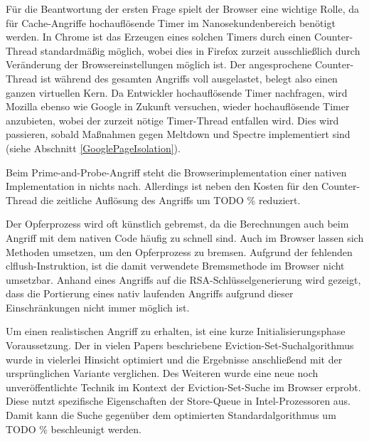 Für die Beantwortung der ersten Frage spielt der Browser eine wichtige Rolle, da für Cache-Angriffe hochauflösende Timer im Nanosekundenbereich benötigt werden.
In Chrome ist das Erzeugen eines solchen Timers durch einen Counter-Thread standardmäßig möglich, wobei dies in Firefox zurzeit ausschließlich durch Veränderung der Browsereinstellungen möglich ist.
Der angesprochene Counter-Thread ist während des gesamten Angriffs voll ausgelastet, belegt also einen ganzen virtuellen Kern.
Da Entwickler hochauflösende Timer nachfragen, wird Mozilla ebenso wie Google in Zukunft versuchen, wieder hochauflösende Timer anzubieten, wobei der zurzeit nötige Timer-Thread entfallen wird.
Dies wird passieren, sobald Maßnahmen gegen Meltdown und Spectre implementiert sind (siehe Abschnitt \ref{GooglePageIsolation}).




Beim Prime-and-Probe-Angriff steht die Browserimplementation einer nativen Implementation in nichts nach. Allerdings ist neben den Kosten für den Counter-Thread die zeitliche Auflösung des Angriffs um  TODO \% reduziert.

Der Opferprozess wird oft künstlich gebremst, da die Berechnungen auch beim Angriff mit dem nativen Code häufig zu schnell sind.
Auch im Browser lassen sich Methoden umsetzen, um den Opferprozess zu bremsen. %
Aufgrund der fehlenden clflush-Instruktion, ist die damit verwendete Bremsmethode im Browser nicht umsetzbar.
Anhand eines Angriffs auf die RSA-Schlüsselgenerierung wird gezeigt, dass die Portierung eines nativ laufenden Angriffs aufgrund dieser Einschränkungen nicht immer möglich ist.



Um einen realistischen Angriff zu erhalten, ist eine kurze Initialisierungsphase Voraussetzung.
Der in vielen Papers beschriebene Eviction-Set-Suchalgorithmus \cite{PrimeAndAbort, LiuPrimeAndProbe, DriveByPaper} wurde in vielerlei Hinsicht optimiert und die Ergebnisse anschließend mit der ursprünglichen Variante verglichen. 
Des Weiteren wurde eine neue noch unveröffentlichte Technik im Kontext der Eviction-Set-Suche im Browser erprobt.
Diese nutzt spezifische Eigenschaften der Store-Queue in Intel-Prozessoren aus.
Damit kann die Suche gegenüber dem optimierten Standardalgorithmus um  TODO \% beschleunigt werden.

